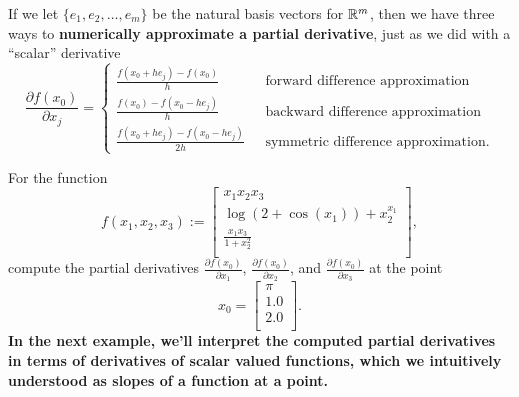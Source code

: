  \begin{tcolorbox}[title=\textbf{Partial Derivatives as Motivated by a Linear Approximation to a Function about a Point}]
If we let $\{e_1, e_2, \ldots, e_m \}$ be the natural basis vectors for $\mathbb R^m$, then we have three ways to \textbf{numerically approximate a partial derivative}, just as we did with a ``scalar'' derivative 
\begin{equation}
    \label{eq:partialDerivativesDifferenceApproximations}
    \frac{\partial f(x_0)}{\partial x_j}= \left\{ \begin{aligned}
        \frac{f(x_0+h e_j)-f(x_0)}{h}& ~~~ \text{forward difference approximation} \\
      \frac{f(x_0)-f(x_0-h e_j)}{h} &~~~  \text{backward difference approximation} \\
        \frac{f(x_0+h e_j)-f(x_0-h e_j)}{2h} & ~~~\text{symmetric difference approximation}.
    \end{aligned} \right.
    \end{equation}
\end{tcolorbox}
\vspace*{0.2cm}

 
 \begin{example}
 \label{ex:PartialDerivativesSymmericDifferences}
 For the function 
 \begin{equation}
 \label{eq:fR3ToR3}
 f(x_1,x_2,x_3):= 
 \left[
\begin{array}{c}
x_1 x_2 x_3  \\
\log(2+\cos(x_1)) + x_2^{x_1} \\
 \frac{x_1 x_3}{1+ x_2^2} \\
\end{array}
\right],
 \end{equation}
 compute the partial derivatives $\frac{\partial f(x_0)}{\partial x_1}$, $\frac{\partial f(x_0)}{\partial x_2}$, and $\frac{\partial f(x_0)}{\partial x_3}$ at the point 
 $$x_0 = \left[
\begin{array}{c}
\pi \\
1.0 \\
2.0 \\
\end{array}
\right].$$
\textbf{In the next example, we'll interpret the computed partial derivatives in terms of derivatives of scalar valued functions, which we intuitively understood as slopes of a function at a point.} 
  \end{example}
 
